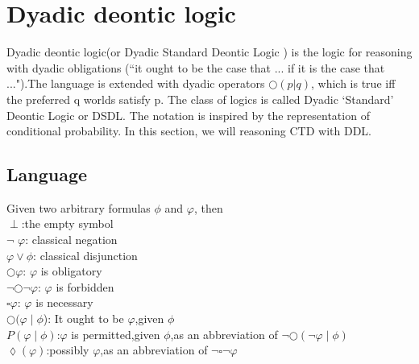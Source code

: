 \documentclass{article}
\begin{document}
\section{Dyadic deontic logic}
Dyadic deontic logic(or Dyadic Standard Deontic Logic ) is the logic for reasoning with dyadic obligations (“it ought to be the case that ... if it is the case that ...").The language is extended with dyadic operators 
 $\bigcirc(p|q)$, which is true iff the preferred q worlds satisfy p. The class of logics is called Dyadic ‘Standard’ Deontic Logic or DSDL. The notation is inspired by the representation of conditional probability.
In this section, we will reasoning CTD with DDL.
\subsection{Language}
Given two arbitrary formulas $\phi$  and $\varphi$, then\\
$\perp$:the empty symbol\\
$\neg$ $\varphi$: classical negation\\
$\varphi \vee  \phi $: classical disjunction\\
$\bigcirc \varphi $: $\varphi$ is obligatory\\
$ \neg \bigcirc\neg\varphi$: $ \varphi$ is forbidden\\
$ \square\varphi$: $\varphi$ is necessary\\
$\bigcirc(\varphi\mid\phi$): It ought to be $\varphi$,given $\phi$\\
$P(\varphi\mid\phi) $:$\varphi$ is permitted,given $\phi$,as an abbreviation of $\neg\bigcirc(\neg\varphi\mid\phi)$\\
$\lozenge(\varphi)$:possibly $\varphi$,as an abbreviation of $\neg\square\neg\varphi$
\end{document}
